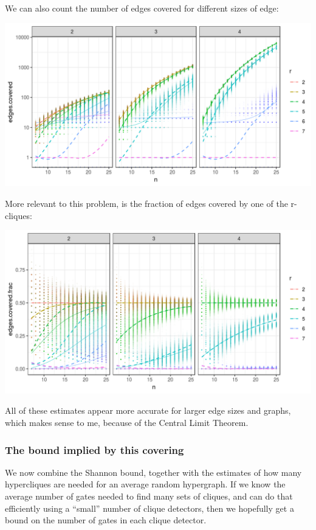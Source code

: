 \documentclass[12pt]{article}
\theoremstyle{definition}
\begin{document}
We can also count the number of edges covered for different sizes
of edge:

\includegraphics[width=1\textwidth]{cliqueCounter/R/edgesCovered.png}

More relevant to this problem, is the fraction of edges covered
by one of the r-cliques:

\includegraphics[width=1\textwidth]{cliqueCounter/R/fracCovered.png}

All of these
estimates appear more accurate for larger edge sizes and graphs, which
makes sense to me, because of the Central Limit Theorem.

\subsubsection{The bound implied by this covering}

We now combine the Shannon bound, together with the estimates of how many
hypercliques are needed for an average random hypergraph.
If we know the average number of gates needed to find many sets of cliques, and
can do that efficiently using a ``small'' number of clique detectors,
then we hopefully get a bound on the number of gates in each clique detector.
\end{document}
